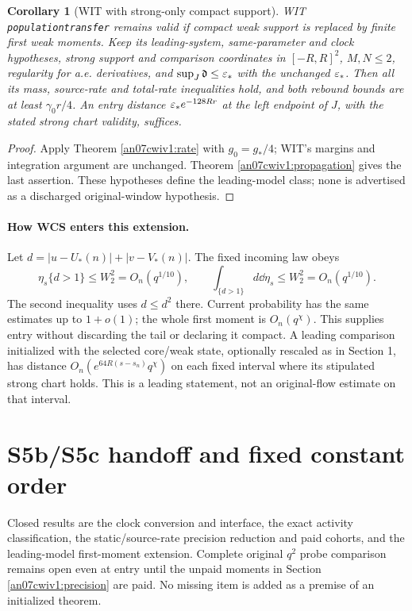 \documentclass[11pt]{article}
\numberwithin{equation}{section}
\newtheorem{corollary}[theorem]{Corollary}
\theoremstyle{remark}\newtheorem{remark}[theorem]{Remark}
\newcommand{\dist}{\mathfrak d}
\begin{document}
\begin{corollary}[WIT with strong-only compact support]
\label{an07cwiv1:witness}
WIT \texttt{populationtransfer} remains valid if compact weak
support is replaced by finite first weak moments.
Keep its leading-system, same-parameter and clock hypotheses,
strong support and comparison coordinates in \([-R,R]^2\),
\(M,N\le2\), regularity for a.e. derivatives, and
\(\sup_J\dist\le\eps_*\) with the unchanged \(\varepsilon_*\).
Then all its mass, source-rate and total-rate inequalities
hold, and both rebound bounds are at least \(\gamma_0r/4\).
An entry distance \(\varepsilon_*e^{-128Rr}\) at the left endpoint
of \(J\), with the stated strong chart validity, suffices.
\end{corollary}
\begin{proof}
Apply Theorem \ref{an07cwiv1:rate} with \(g_0=g_*/4\);
WIT's margins and integration argument are unchanged.
Theorem \ref{an07cwiv1:propagation} gives the last assertion.
These hypotheses define the leading-model class; none is
advertised as a discharged original-window hypothesis.
\end{proof}

\paragraph{How WCS enters this extension.}
Let \(d=|u-U_*(n)|+|v-V_*(n)|\). The fixed incoming law obeys
\[
 \eta_s\{d>1\}\le W_2^2=O_n(q^{1/10}),\qquad
 \int_{\{d>1\}}d\dd\eta_s\le W_2^2=O_n(q^{1/10}).
 \]
The second inequality uses \(d\le d^2\) there.
Current probability has the same estimates up to \(1+o(1)\);
the whole first moment is \(O_n(q^\chi)\).
This supplies entry without discarding the tail or declaring it
compact. A leading comparison initialized with the selected
core/weak state, optionally rescaled as in Section 1, has distance
\(O_n(e^{64R(s-s_n)}q^\chi)\) on each fixed interval where its
stipulated strong chart holds. This is a leading statement,
not an original-flow estimate on that interval.

\section{S5b/S5c handoff and fixed constant order}
\label{an07cwiv1:handoff}
Closed results are the clock conversion and interface,
the exact activity classification, the static/source-rate
precision reduction and paid cohorts, and the leading-model
first-moment extension. Complete original \(q^2\) probe
comparison remains open even at entry until the unpaid moments
in Section \ref{an07cwiv1:precision} are paid. No missing item
is added as a premise of an initialized theorem.
\end{document}

